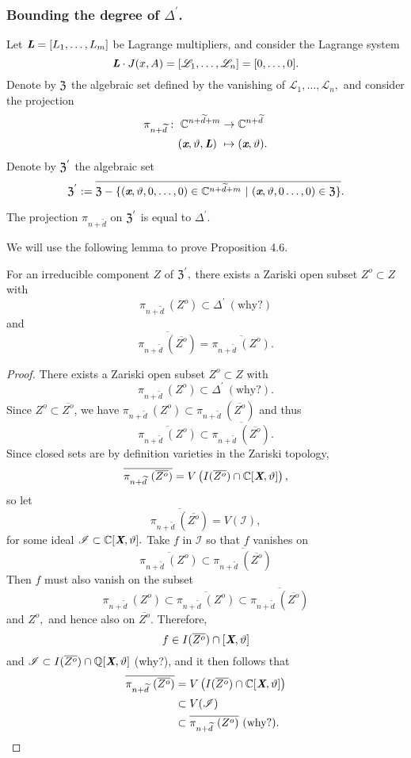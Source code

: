 \documentclass[sigconf]{acmart}
\def\Xb{\textit{\textbf{X}}}
\def\C{\mathbb{C}}
\def\vt{\vartheta}
\def\dt{\widetilde{d}}
\def\D{\Delta}
\def\Z{\frak{Z}}
\begin{document}
\subsubsection{Bounding the degree of $\Delta^{'}$.}
% 
Let $\textit{\textbf{L}}=[L_1,\hdots,L_m]$ be Lagrange multipliers, and consider the Lagrange system 
\[
\textit{\textbf{L}}\cdot J(x,A)=[\mathscr{L}_1,\hdots,\mathscr{L}_{n}]=[0,\hdots,0].
\] 
Denote by $\frak{Z}$ the algebraic set defined by the vanishing of $\mathscr{L}_1,\hdots,\mathscr{L}_{n},$ and consider the projection 
\begin{align*} 
\pi_{n+\dt} :~ \C^{n+\dt+m} &\rightarrow \C^{n+\dt}\\
(\textit{\textbf{x}},\vt,\textit{\textbf{L}})~ &\mapsto (\textit{\textbf{x}},\vt).
\end{align*}
Denote by $\frak{Z}^{'}$ the algebraic set
\[
\frak{Z}^{'} := \overline{\frak{Z} - \{(\textit{\textbf{x}},\vt,0,\hdots,0) \in \C^{n+\dt+m}~|~(\textit{\textbf{x}},\vt,0\hdots,0) \in \frak{Z}\}}.
\]
\begin{proposition}  
The projection $\pi_{n+\dt}$ on $\frak{Z}^{'}$ is equal to $\Delta^{'}$.
\end{proposition}
%
We will use the following lemma to prove Proposition 4.6.
%
%
\begin{lemma} 
For an irreducible component $Z$ of $\Z^{'},$ there exists a Zariski open subset $Z^o \subset Z$ with \[\pi_{n+\dt}~(Z^{o}) \subset \D^{'}~(\textrm{why?})\]
and
\[\overline{\pi_{n+\dt}~(\overline{Z^o})} = \overline{\pi_{n+\dt}~(Z^o)}.\] 
\end{lemma} 
\begin{proof}
There exists a Zariski open subset $Z^o \subset Z$ with 
%
\[\pi_{n+\dt}~(Z^{o}) \subset \D^{'}~(\textrm{why?}).\] 
%
Since $Z^o \subset \overline{Z^o}$, we have $\pi_{n+\dt}~(Z^o) \subset \pi_{n+\dt}~(\overline{Z^o})$ and thus 
\[\overline{\pi_{n+\dt}~(Z^o)} \subset \overline{\pi_{n+\dt}~(\overline{Z^o})}.
\]   
Since closed sets are by definition varieties in the Zariski topology, \[\overline{\pi_{n+\dt}~(\overline{Z^o})} = V\left( I(\overline{Z^o}) \cap \mathbb{C}[\textit{\textbf{X}},\vt]\right),
\] 
so let 
\[\overline{\pi_{n+\dt}~(\overline{Z^o})} = V(\mathscr{I}),
\] 
for some ideal $\mathscr{I} \subset \C[\Xb,\vt].$ Take $f$ in $\mathscr{I}$ so that $f$ vanishes on 
\[
\overline{\pi_{n+\dt}~(Z^o)}\subset \overline{\pi_{n+\dt}~(\overline{Z^o})}
\]
Then $f$ must also vanish on the subset 
\[
\pi_{n+\dt}~(Z^o)\subset \overline{\pi_{n+\dt}~(Z^o)}\subset \overline{\pi_{n+\dt}~(\overline{Z^o})}
\]
and $Z^o,$ and hence also on $\overline{Z^o}.$ Therefore, 
\[
f \in I(\overline{Z^o}) \cap \mathbb{}[\textit{\textbf{X}},\vt]
\]
and  $\mathscr{I} \subset I(\overline{Z^o}) \cap \mathbb{Q}[\textit{\textbf{X}},\vt]$ (why?), and it then follows that 
\begin{align*}
\overline{\pi_{n+\dt}~(\overline{Z^o})}&=V\left(I(\overline{Z^o})\cap \mathbb{C}[\textit{\textbf{X}},\vt]\right) \\&\subset V(\mathscr{I})\\&\subset \overline{\pi_{n + \dt}~(Z^o)}\textrm{ (why?)}.
\end{align*}
\end{proof}
\end{document}
